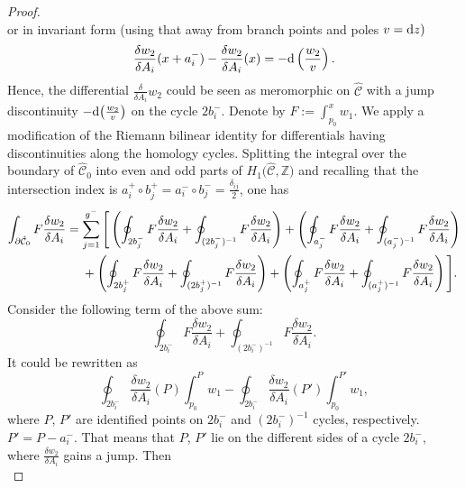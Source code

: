 \documentclass[pdftex]{sigma}
\numberwithin{equation}{section}
\theoremstyle{definition}
\newcommand{\Z}{\mathbb{Z}}
\begin{document}
\begin{proof}
\begin{equation*}
\end{equation*}
or in invariant form (using that away from branch points and poles $v={\rm d}z)$
\begin{equation*}
\frac{\delta w_2}{\delta A_i}(x+a^-_i)-\frac{\delta w_2}{\delta A_i}(x)=-{\rm d} \left(\frac{w_2}{v}\right).
\end{equation*}
Hence, the differential $\frac{\delta}{\delta A_i}w_2$ could be seen as meromorphic on $\hat{\mathcal{C}}$ with a jump discontinuity $-{\rm d}\big(\frac{w_2}{v}\big)$ on the cycle $2b^-_i.$ Denote by $F:=\int^x_{p_0}w_1$. We apply a modification of the Riemann bilinear identity for differentials having discontinuities along the homology cycles. Splitting the integral over the boundary of $\hat{\mathcal{C}}_0$ into even and odd parts of $H_1\big(\hat{\mathcal{C}}, \Z\big)$ and recalling that the intersection index is $a_i^+ \circ b_j^+=a_i^- \circ b_j^- =\frac{\delta_{ij}}{2}$, one has
\begin{gather}\int_{\partial \hat{\mathcal{C}}_0}F\frac{\delta w_2}{\delta A_i} = \sum^{g^-}_{j=1}\Bigg[\left(\oint_{ 2b^-_j}F \frac{\delta w_2}{\delta A_i}+\oint_{( 2b^-_j)^{-1}}F\frac{\delta w_2}{\delta A_i} \right)+\left(\oint_{ a^-_j}F \frac{\delta w_2}{\delta A_i}+\oint_{( a^-_j)^{-1}}F \frac{\delta w_2}{\delta A_i} \right)
\nonumber\\
\hphantom{\int_{\partial \hat{\mathcal{C}}_0}F\frac{\delta w_2}{\delta A_i} =}{}
+\left(\oint_{ 2b^+_j}F \frac{\delta w_2}{\delta A_i}+\oint_{( 2b^+_j)^{-1}}F\frac{\delta w_2}{\delta A_i} \right)+\left(\oint_{ a^+_j}F \frac{\delta w_2}{\delta A_i} +\oint_{( a^+_j)^{-1}}F \frac{\delta w_2}{\delta A_i} \right)\Bigg].\label{86}
\end{gather}
Consider the following term of the above sum:
\begin{equation*}%
\oint_{ 2b^-_i}F \frac{\delta w_2}{\delta A_i}+\oint_{( 2b^-_i)^{-1}}F \frac{\delta w_2}{\delta A_i}. \end{equation*}
It could be rewritten as
\begin{equation}\label{89}
\oint_{ 2b^-_i}\frac{\delta w_2}{\delta A_i}(P)\int^P_{p_0}w_1-\oint_{ 2b^-_i}\frac{\delta w_2}{\delta A_i}(P')\int^{P'}_{p_0}w_1,
\end{equation} where $P$, $P'$ are identified points on $ 2b^-_i$ and $(2 b^-_i)^{-1}$ cycles, respectively. $P'=P-a^-_i$.
That means that $P$, $P'$ lie on the different sides of a cycle $ 2b^-_i$, where $\frac{ \delta w_2}{\delta A_i}$ gains a jump. Then
\begin{equation*}%

\end{equation*}
\end{proof}
\end{document}
